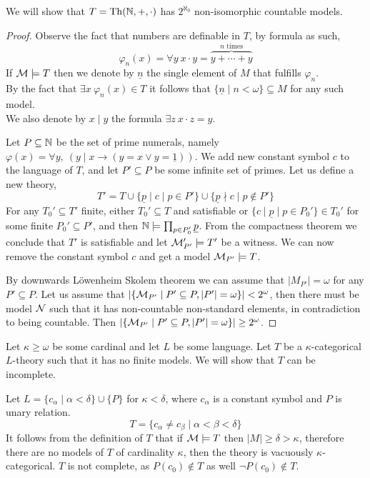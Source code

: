 \question{}
We will show that $T = \operatorname{Th}(\mathbb{N}, +, \cdot)$ has $2^{\aleph_0}$ non-isomorphic countable models.
\begin{proof}
	Observe the fact that numbers are definable in $T$, by formula as such,
	\[
		\varphi_{n}(x) = \forall y\ x \cdot y = \overbrace{y + \cdots + y}^{\text{$n$ times}}
	\]
	If $\mathcal{M} \models T$ then we denote by $\underline{n}$ the single element of $M$ that fulfills $\varphi_{n}$. \\
	By the fact that $\exists x\ \varphi_n(x) \in T$ it follows that $\{ \underline{n} \mid n < \omega \} \subseteq M$ for any such model. \\
	We also denote by $x \mid y$ the formula $\exists z\ x \cdot z = y$.

	Let $P \subseteq \mathbb{N}$ be the set of prime numerals, namely $\varphi(x) = \forall y,\ (y \mid x \to (y = x \lor y = \underline{1}))$.
	We add new constant symbol $c$ to the language of $T$, and let $P' \subseteq P$ be some infinite set of primes.
	Let us define a new theory,
	\[
		T' = T \cup \{ \underline{p} \mid c \mid p \in P' \} \cup \{ \underline{p} \nmid c \mid p \notin P' \}
	\]
	For any $T_0' \subseteq T'$ finite, either $T_0' \subseteq T$ and satisfiable or $\{ c \mid \underline{p} \mid p \in P_0' \} \in T_0'$ for some finite $P_0' \subseteq P'$,
	and then $\mathbb{N} \models \prod_{p \in P_0'} \underline{p}$.
	From the compactness theorem we conclude that $T'$ is satisfiable and let $\mathcal{M}_{P'}' \models T'$ be a witness.
	We can now remove the constant symbol $c$ and get a model $\mathcal{M}_{P'} \models T$.

	By downwards Löwenheim Skolem theorem we can assume that $|M_{P'}| = \omega$ for any $P' \subseteq P$.
	Let us assume that $|\{ \mathcal{M}_{P'} \mid P' \subseteq P, |P'| = \omega \}| < 2^{\omega}$, then there must be model $\mathcal{N}$ such that it has non-countable non-standard elements, in contradiction to being countable.
	Then $|\{ \mathcal{M}_{P'} \mid P' \subseteq P, |P'| = \omega \}| \ge 2^{\omega}$.
\end{proof}

\question{}
Let $\kappa \ge \omega$ be some cardinal and let $L$ be some language.
Let $T$ be a $\kappa$-categorical $L$-theory such that it has no finite models.
We will show that $T$ can be incomplete.
\begin{solution}
	Let $L = \{ c_{\alpha} \mid \alpha < \delta \} \cup \{ P \}$ for $\kappa < \delta$, where $c_{\alpha}$ is a constant symbol and $P$ is unary relation.
	\[
		T = \{ c_{\alpha} \ne c_{\beta} \mid \alpha < \beta < \delta \}
	\]
	It follows from the definition of $T$ that if $\mathcal{M} \models T$ then $|M| \ge \delta > \kappa$, therefore there are no models of $T$ of cardinality $\kappa$, then the theory is vacuously $\kappa$-categorical.
	$T$ is not complete, as $P(c_0) \notin T$ as well $\lnot P(c_0) \notin T$.
\end{solution}

